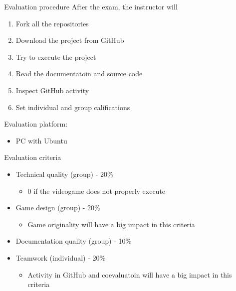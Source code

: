 \documentclass[10pt,compress]{beamer} %
\begin{document}
\begin{frame}{Evaluation procedure}
	After the exam, the instructor will
	\begin{enumerate}
	\item Fork all the repositories
	\item Download the project from GitHub
	\item Try to execute the project
	\item Read the documentatoin and source code
	\item Inspect GitHub activity
	\item Set individual and group califications
	\end{enumerate}

	Evaluation platform:
	\begin{itemize}
	\item PC with Ubuntu
	\end{itemize}
\end{frame}

\begin{frame}{Evaluation criteria}
	\begin{itemize}	
	\item Technical quality (group) - 20\%
	    \begin{itemize}
	    \item $0$ if the videogame does not properly execute
	    \end{itemize}
	\item Game design (group) - 20\%
	    \begin{itemize}
	    \item Game originality will have a big impact in this criteria
	    \end{itemize}
	\item Documentation quality (group) - 10\%
	\item Teamwork (individual) - 20\%
	    \begin{itemize}
	    \item Activity in GitHub and coevaluatoin will have a big impact in this criteria
	    \end{itemize}
	\end{itemize}
\end{frame}
\end{document}
